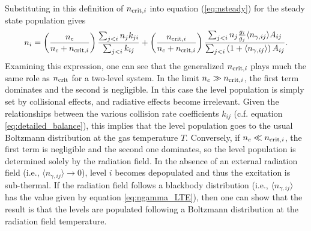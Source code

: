 Substituting in this definition of $n_{{\rm crit},i}$ into equation (\ref{eq:nsteady}) for the steady state population gives
\begin{equation}
n_i = \left(\frac{n_c}{n_c+n_{{\rm crit},i}}\right) \frac{\sum_{j<i} n_j k_{ji}}{\sum_{j<i} k_{ij}}
+ \left(\frac{n_{{\rm crit},i}}{n_c+n_{{\rm crit},i}}\right) \frac{\sum_{j<i} n_j \frac{g_i}{g_j} \langle n_{\gamma,ij}\rangle A_{ij}}{\sum_{j<i} \left(1+\langle n_{\gamma,ij}\rangle\right) A_{ij}}.
\end{equation}
Examining this expression, one can see that the generalized $n_{{\rm crit},i}$ plays much the same role as $n_{\rm crit}$ for a two-level system. In the limit $n_c \gg n_{{\rm crit},i}$, the first term dominates and the second is negligible. In this case the level population is simply set by collisional effects, and radiative effects become irrelevant. Given the relationships between the various collision rate coefficients $k_{ij}$ (c.f. equation \ref{eq:detailed_balance}), this implies that the level population goes to the usual Boltzmann distribution at the gas temperature $T$. Conversely, if $n_c \ll n_{{\rm crit},i}$, the first term is negligible and the second one dominates, so the level population is determined solely by the radiation field. In the absence of an external radiation field (i.e., $\langle n_{\gamma,ij}\rangle \rightarrow 0$), level $i$ becomes depopulated and thus the excitation is sub-thermal. If the radiation field follows a blackbody distribution (i.e., $\langle n_{\gamma,ij}\rangle$ has the value given by equation \ref{eq:ngamma_LTE}), then one can show that the result is that the levels are populated following a Boltzmann distribution at the radiation field temperature.

